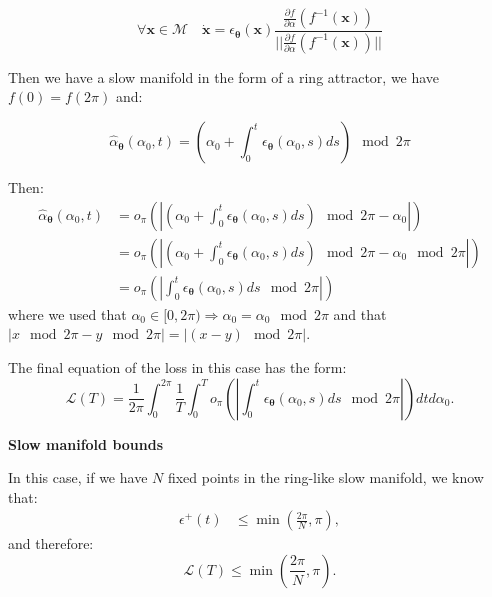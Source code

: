 \documentclass{article} %
\newcounter{ct}
\newcommand{\manifold}{\mathcal{M}}
\theoremstyle{definition}
\theoremstyle{remark}
\begin{document}
\begin{equation}
\forall \bm{x} \in \manifold \quad \dot{\bm{x}} = \epsilon_{\bm{\theta}}(\bm{x})\frac{\frac{\partial f}{\partial \alpha}(f^{-1}(\bm{x}))}{||\frac{\partial f}{\partial \alpha}(f^{-1}(\bm{x}))||}
\end{equation}


Then we have a slow manifold in the form of a ring attractor, we have \(f(0) = f(2 \pi)\) and:

\begin{equation}
    \hat{\alpha}_{\boldsymbol{\theta}}(\alpha_0, t) = \left(\alpha_0 + \int_0^t \epsilon_{\bm{\theta}}(\alpha_0, s) ds \right)\mod 2 \pi
\end{equation}


Then:
\begin{equation}
\begin{split}
    \hat{\alpha}_{\boldsymbol{\theta}}(\alpha_0, t) &= o_\pi \left( \left| \left(\alpha_0 + \int_0^t \epsilon_{\bm{\theta}}(\alpha_0, s) ds \right)\mod 2 \pi - \alpha_0 \right| \right)  \\
    &= o_\pi \left( \left| \left(\alpha_0 + \int_0^t \epsilon_{\bm{\theta}}(\alpha_0, s) ds \right)\mod 2 \pi - \alpha_0 \mod 2 \pi \right| \right) \\
    &= o_\pi \left( \left| \int_0^t \epsilon_{\bm{\theta}}(\alpha_0, s) ds \mod 2 \pi \right| \right)
\end{split}
\end{equation}
where we used that \(\alpha_0 \in [0,2 \pi) \Rightarrow \alpha_0 = \alpha_0 \mod 2 \pi\) and that \(|x \mod 2 \pi - y \mod 2 \pi| = |(x-y) \mod 2 \pi|\). %

The final equation of the loss in this case has the form:
\begin{equation}
    \mathcal{L}(T) =  \frac{1}{2 \pi} \int_0^{2 \pi} \frac{1}{T} \int_0^T o_\pi \left( \left| \int_0^t \epsilon_{\bm{\theta}}(\alpha_0, s) ds \mod 2 \pi \right| \right) dt d\alpha_0.
\end{equation}

\textbf{Slow manifold bounds}

In this case, if we have \(N\) fixed points in the ring-like slow manifold, we know that:
\begin{equation}
\begin{split}
     \epsilon^+(t) &\leq \min \left( \frac{2 \pi}{N}, \pi \right),
\end{split}
\end{equation}
and therefore:
\begin{equation}
    \mathcal{L}(T) \leq \min \left( \frac{2 \pi}{N}, \pi \right).
\end{equation}
\end{document}
